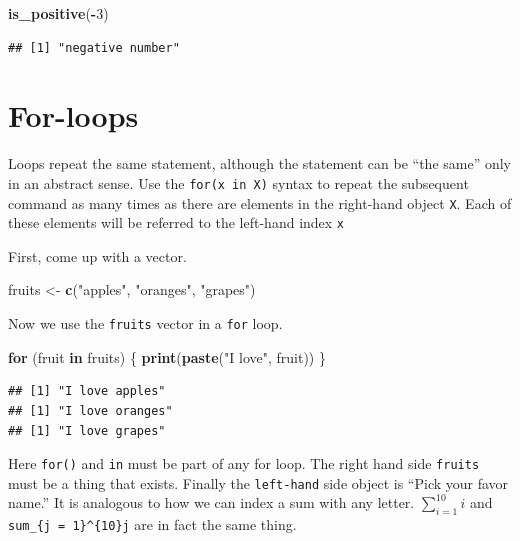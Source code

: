 \documentclass[]{book}
\newenvironment{Shaded}{\begin{snugshade}}{\end{snugshade}}
\newcommand{\KeywordTok}[1]{\textcolor[rgb]{0.13,0.29,0.53}{\textbf{#1}}}
\newcommand{\DecValTok}[1]{\textcolor[rgb]{0.00,0.00,0.81}{#1}}
\newcommand{\StringTok}[1]{\textcolor[rgb]{0.31,0.60,0.02}{#1}}
\newcommand{\ControlFlowTok}[1]{\textcolor[rgb]{0.13,0.29,0.53}{\textbf{#1}}}
\newcommand{\OperatorTok}[1]{\textcolor[rgb]{0.81,0.36,0.00}{\textbf{#1}}}
\newcommand{\NormalTok}[1]{#1}
\theoremstyle{definition}
\theoremstyle{definition}
\theoremstyle{definition}
\theoremstyle{remark}
\begin{document}
\begin{Shaded}
\begin{Highlighting}[]
\KeywordTok{is_positive}\NormalTok{(}\OperatorTok{-}\DecValTok{3}\NormalTok{)}
\end{Highlighting}
\end{Shaded}

\begin{verbatim}
## [1] "negative number"
\end{verbatim}

\section{For-loops}\label{for-loops}

Loops repeat the same statement, although the statement can be ``the
same'' only in an abstract sense. Use the \texttt{for(x\ in\ X)} syntax
to repeat the subsequent command as many times as there are elements in
the right-hand object \texttt{X}. Each of these elements will be
referred to the left-hand index \texttt{x}

First, come up with a vector.

\begin{Shaded}
\begin{Highlighting}[]
\NormalTok{fruits <-}\StringTok{ }\KeywordTok{c}\NormalTok{(}\StringTok{"apples"}\NormalTok{, }\StringTok{"oranges"}\NormalTok{, }\StringTok{"grapes"}\NormalTok{)}
\end{Highlighting}
\end{Shaded}

Now we use the \texttt{fruits} vector in a \texttt{for} loop.

\begin{Shaded}
\begin{Highlighting}[]
\ControlFlowTok{for}\NormalTok{ (fruit }\ControlFlowTok{in}\NormalTok{ fruits) \{}
  \KeywordTok{print}\NormalTok{(}\KeywordTok{paste}\NormalTok{(}\StringTok{"I love"}\NormalTok{, fruit))}
\NormalTok{\}}
\end{Highlighting}
\end{Shaded}

\begin{verbatim}
## [1] "I love apples"
## [1] "I love oranges"
## [1] "I love grapes"
\end{verbatim}

Here \texttt{for()} and \texttt{in} must be part of any for loop. The
right hand side \texttt{fruits} must be a thing that exists. Finally the
\texttt{left-hand} side object is ``Pick your favor name.'' It is
analogous to how we can index a sum with any letter.
\(\sum_{i=1}^{10}i\) and \texttt{sum\_\{j\ =\ 1\}\^{}\{10\}j} are in
fact the same thing.
\end{document}
